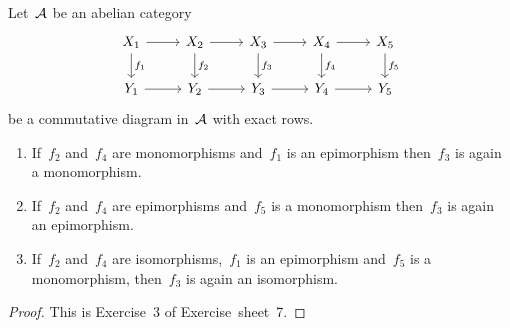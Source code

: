 \begin{lemma*}[5-Lemma]
  Let~$\mathcal{A}$ be an abelian category
  \[
    \begin{tikzcd}
        X_1
        \arrow{r}
        \arrow{d}[right]{f_1}
      & X_2
        \arrow{r}
        \arrow{d}[right]{f_2}
      & X_3
        \arrow{r}
        \arrow{d}[right]{f_3}
      & X_4
        \arrow{r}
        \arrow{d}[right]{f_4}
      & X_5
        \arrow{d}[right]{f_5}
      \\
        Y_1
        \arrow{r}
      & Y_2
        \arrow{r}
      & Y_3
        \arrow{r}
      & Y_4
        \arrow{r}
      & Y_5
    \end{tikzcd}
  \]
  be a commutative diagram in~$\mathcal{A}$ with exact rows.
  \begin{enumerate}
    \item
      If~$f_2$ and~$f_4$ are monomorphisms and~$f_1$ is an epimorphism then~$f_3$ is again a monomorphism.
    \item
      If~$f_2$ and~$f_4$ are epimorphisms and~$f_5$ is a monomorphism then~$f_3$ is again an epimorphism.
    \item
      If~$f_2$ and~$f_4$ are isomorphisms,~$f_1$ is an epimorphism and~$f_5$ is a monomorphism, then~$f_3$ is again an isomorphism.
  \end{enumerate}
\end{lemma*}


\begin{proof}
  This is Exercise~3 of Exercise~sheet~7.
\end{proof}


